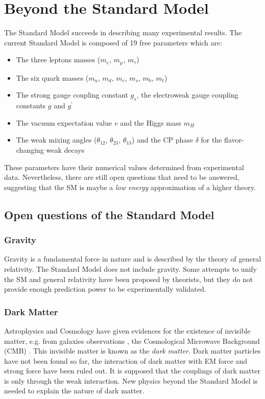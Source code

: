 \section{Beyond the Standard Model}
\label{sec:BeyondSM}

The Standard Model succeeds in describing many experimental results. The current Standard Model is composed of 19 free parameters which are:
\begin{itemize}[noitemsep]
  \item The three leptons masses ($m_e$, $m_{\mu}$, $m_{\tau}$)
  \item The six quark masses ($m_u$, $m_d$, $m_c$, $m_s$, $m_b$, $m_t$)
  \item The strong gauge coupling constant $g_s$, the electroweak gauge coupling constants $g$ and $g^{\prime}$
  \item The vacuum expectation value $v$ and the Higgs mass $m_H$
  \item The weak mixing angles ($\theta_{12}$, $\theta_{23}$, $\theta_{13}$) and the CP phase $\delta$ for the flavor-changing weak decays \cite{Kobayashi:1973pt}
\end{itemize}
These parameters have their numerical values determined from experimental data. Nevertheless, there are still open questions that need to be answered, suggesting that the SM is maybe a \textit{low energy} approximation of a higher theory.

\subsection{Open questions of the Standard Model}

\subsubsection*{Gravity}

Gravity is a fundamental force in nature and is described by the theory of general relativity. The Standard Model does not include gravity. Some attempts to unify the SM and general relativity have been proposed by theorists, but they do not provide enough prediction power to be experimentally validated.

\subsubsection*{Dark Matter}

Astrophysics and Cosmology have given evidences for the existence of invisible matter, e.g. from galaxies observations \cite{Battistelli:2017zrp}, the Cosmological Microwave Background (CMB) \cite{Giesen:2012rp}. This invisible matter is known as the \textit{dark matter}. Dark matter particles have not been found so far, the interaction of dark matter with EM force and strong force have been ruled out. It is supposed that the couplings of dark matter is only through the weak interaction. New physics beyond the Standard Model is needed to explain the nature of dark matter.

